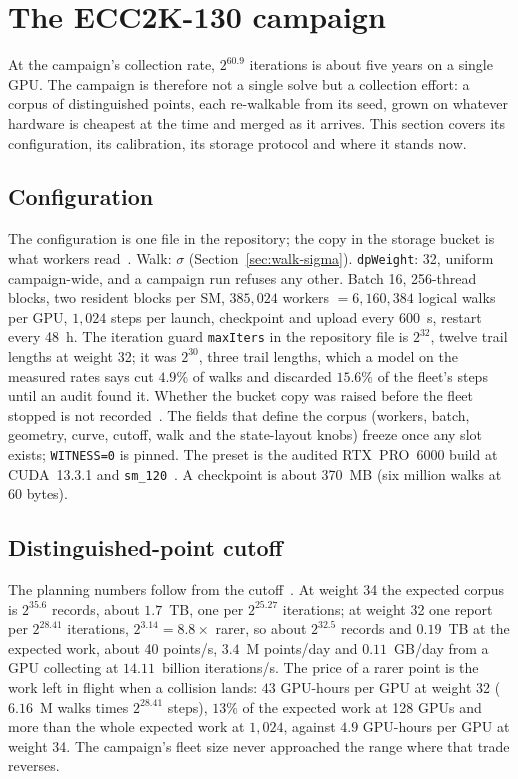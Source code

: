 \section{The ECC2K-130 campaign}
\label{sec:campaign}

At the campaign's collection rate, $2^{60.9}$ iterations is about
five years on a single GPU. The campaign is therefore not a single
solve but a collection effort: a corpus of distinguished points, each
re-walkable from its seed, grown on whatever hardware is cheapest at
the time and merged as it arrives. This section covers its
configuration, its calibration, its storage protocol and where it
stands now.

\subsection{Configuration}

The configuration is one file in the repository; the copy in the
storage bucket is what workers read~. Walk: $\sigma$ (Section~\ref{sec:walk-sigma}). \texttt{dpWeight}: 32,
uniform campaign-wide, and a campaign run refuses any other. Batch 16,
256-thread blocks, two resident blocks per SM, $385{,}024$ workers
$=6{,}160{,}384$ logical walks per GPU, $1{,}024$ steps per launch,
checkpoint and upload every 600~s, restart every 48~h. The iteration guard \texttt{maxIters} in the repository file is
$2^{32}$, twelve trail lengths at weight 32; it was $2^{30}$, three
trail lengths, which a model on the measured rates says cut $4.9\%$ of
walks and discarded $15.6\%$ of the fleet's steps until an audit found
it. Whether the bucket copy was raised before the fleet stopped is not
recorded~. The fields
that define the corpus (workers, batch, geometry, curve, cutoff, walk
and the state-layout knobs) freeze once any slot exists;
\texttt{WITNESS=0} is pinned. The preset is the audited RTX~PRO~6000 build at CUDA~13.3.1 and
\texttt{sm\_120}~. A checkpoint is about
370~MB (six million walks at 60 bytes).

\subsection{Distinguished-point cutoff}
\label{sec:campaign-interval}

The planning numbers follow from the cutoff~.
At weight 34 the expected corpus is $2^{35.6}$ records, about $1.7$~TB,
one per $2^{25.27}$ iterations; at weight 32 one report per $2^{28.41}$
iterations, $2^{3.14}=8.8\times$ rarer, so about $2^{32.5}$ records and
$0.19$~TB at the expected work, about 40 points/s, $3.4$~M points/day
and $0.11$~GB/day from a GPU collecting at $14.11$~billion iterations/s. The price of a
rarer point is the work left in flight when a collision lands: $43$
GPU-hours per GPU at weight 32 ($6.16$~M walks times $2^{28.41}$
steps), $13\%$ of the expected work at 128 GPUs and more than the
whole expected work at $1{,}024$, against $4.9$ GPU-hours per GPU at
weight 34. The campaign's fleet size never approached the range where
that trade reverses.


